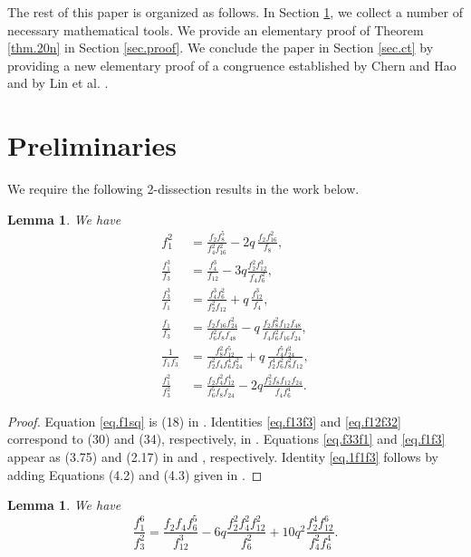 \documentclass{amsart}
\newtheorem{lemma}[theorem]{Lemma}
\theoremstyle{definition}
\begin{document}
The rest of this paper is organized as follows. In Section \ref{sec.prelim},  we collect a number of necessary mathematical tools. We provide an elementary proof of Theorem \ref{thm.20n} in Section \ref{sec.proof}. We conclude the paper in Section \ref{sec.ct} by providing a new elementary proof of a congruence established by Chern and Hao \cite{CH2019} and by Lin et al. \cite{LLWX}.

\section{Preliminaries}\label{sec.prelim}
We require the following 2-dissection results in the work below.
\begin{lemma} We have
\begin{align}
f_1^{2}
&=\frac{f_2f_8^{5}}{f_4^{2}f_{16}^{2}}-2q\,\frac{f_2f_{16}^{2}}{f_8},
\label{eq.f1sq}\\
\frac{f_1^{3}}{f_3}
&=\frac{f_4^{3}}{f_{12}}
-3q\frac{f_2^{2}f_{12}^{3}}{f_4f_6^{2}}
\label{eq.f13f3},\\
\frac{f_3^{3}}{f_1}
&=\frac{f_4^{3}f_6^{2}}{f_2^{2}f_{12}}+q\,\frac{f_{12}^{3}}{f_4},
\label{eq.f33f1}\\
\frac{f_1}{f_3}
&=\frac{f_2f_{16}f_{24}^{2}}{f_6^{2}f_8f_{48}}
-q\,\frac{f_2f_8^{2}f_{12}f_{48}}{f_4f_6^{2}f_{16}f_{24}},
\label{eq.f1f3}\\
\frac1{f_1f_3}
&=\frac{f_8^{2}f_{12}^{5}}{f_2^{2}f_4f_6^{4}f_{24}^{2}}
+q\,\frac{f_4^{5}f_{24}^{2}}{f_2^{4}f_6^{2}f_8^{2}f_{12}}
\label{eq.1f1f3},\\
\frac{f_1^{2}}{f_3^{2}}
&=\frac{f_2f_4^{2}f_{12}^{4}}{f_6^{5}f_8f_{24}}
-2q\frac{f_2^{2}f_8f_{12}f_{24}}{f_4f_6^{4}}\label{eq.f12f32}.
\end{align}
\end{lemma}
\begin{proof}
Equation \eqref{eq.f1sq} is (18) in \cite[Lemma 1]{daSilva-Sellers}. Identities \eqref{eq.f13f3} and \eqref{eq.f12f32} correspond to (30) and (34), respectively, in \cite[Lemma 1]{SS20}. Equations \eqref{eq.f33f1} and \eqref{eq.f1f3} appear as (3.75) and (2.17) in \cite{XiaYao} and \cite{XiaYaob}, respectively. Identity \eqref{eq.1f1f3} follows by adding Equations (4.2) and (4.3) given in \cite[Theorem 4.3]{BaruahOjah}.
\end{proof}
\begin{lemma} We have 
\begin{equation}
\frac{f_1^{6}}{f_3^{2}}
=\frac{f_2f_4f_6^{5}}{f_{12}^{3}}
-6q\frac{f_2^2f_4^2f_{12}^2}{f_6^2}
+10q^{2}\frac{f_2^{4}f_{12}^{6}}{f_4^{2}f_6^{4}}.
\label{eq.f16f32}
\end{equation}
\end{lemma}
\end{document}
